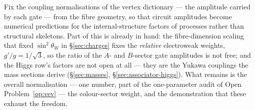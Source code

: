 \begin{openproblem}\label{op:vertex-factors}
Fix the coupling normalisations of the vertex dictionary --- the amplitude carried by each gate ---
from the fibre geometry, so that circuit amplitudes become numerical predictions for the
internal-structure factors of processes rather than structural skeletons. Part of this is already
in hand: the fibre-dimension scaling that fixed $\sin^2\theta_W$ in \S\ref{sec:charges} fixes the
\emph{relative} electroweak weights, $g'/g = 1/\sqrt3$, so the ratio of the $A$- and $B$-sector
gate amplitudes is not free; and the Higgs row's factors are not open at all --- they are the
Yukawa couplings the mass sections derive (\S\ref{sec:masses}, \S\ref{sec:associator-higgs}).
What remains is the overall normalisation --- one number, part of the one-parameter audit of
Open Problem~\ref{op:vev} --- the colour-sector weight, and the demonstration that these exhaust
the freedom.
\end{openproblem}

